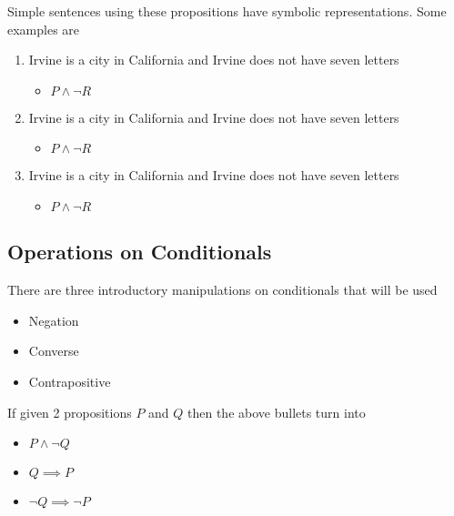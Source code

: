 \documentclass[../notes.tex]{subfiles}
\begin{document}
Simple sentences using these propositions have symbolic representations. Some examples are

\begin{enumerate}
	\item Irvine is a city in California and Irvine does not have seven letters
		\begin{itemize}
			\item $P \land \lnot R$
		\end{itemize}
	\item Irvine is a city in California and Irvine does not have seven letters
		\begin{itemize}
			\item $P \land \lnot R$
		\end{itemize}
	\item Irvine is a city in California and Irvine does not have seven letters
		\begin{itemize}
			\item $P \land \lnot R$
		\end{itemize}
\end{enumerate}

\subsection{Operations on Conditionals}

There are three introductory manipulations on conditionals that will be used

\begin{itemize}
	\item Negation
	\item Converse
	\item Contrapositive
\end{itemize}

If given 2 propositions $P$ and $Q$ then the above bullets turn into

\begin{itemize}
	\item $P \land \lnot Q$
	\item $Q \implies P$
	\item $\lnot Q \implies \lnot P$
\end{itemize}
\end{document}
